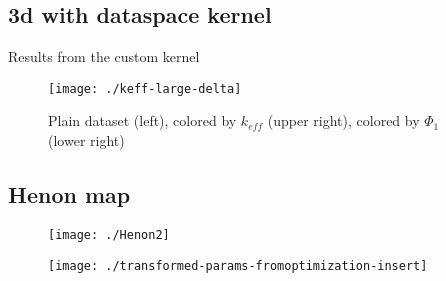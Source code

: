 \documentclass[11pt]{article}
\begin{document}
\clearpage

\subsection{3d with dataspace kernel}

Results from the custom kernel

\begin{figure}[htbp]
  \centering
  \texttt{[image: ./keff-large-delta]}
  \caption{Plain dataset (left), colored by $k_{eff}$ (upper right), colored by $\Phi_1$ (lower right)}
\end{figure}


\subsection{Henon map}

\begin{figure}[htbp]
  \centering
  \texttt{[image: ./Henon2]}
\end{figure}

\begin{figure}[htbp]
  \centering
  \texttt{[image: ./transformed-params-fromoptimization-insert]}
\end{figure}

% 
% 
\end{document}

